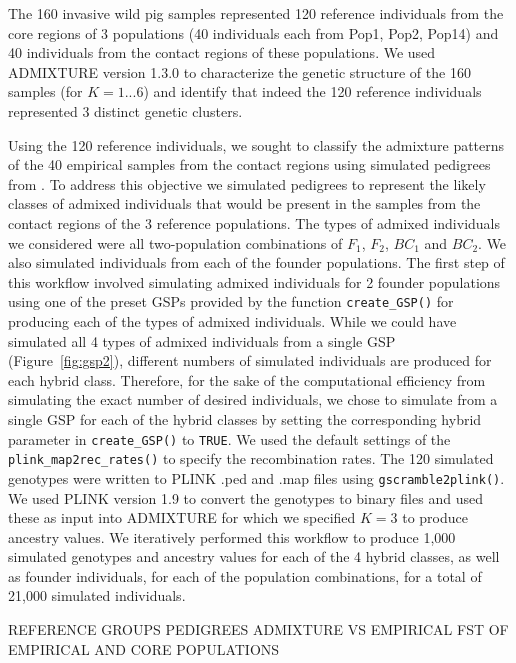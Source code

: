 {The 160 invasive wild pig samples represented 120 reference individuals from the core regions of 
3 populations (40 individuals each from Pop1, Pop2, Pop14) and 40 individuals from the contact regions of these populations. 
We used ADMIXTURE version 1.3.0 \citep{alexander2009fast} to characterize the genetic structure of the 160 samples (for $K = {1...6}$)
and identify that indeed the 120 reference individuals represented 3 distinct genetic clusters.

Using the 120 reference individuals, we sought to classify the admixture patterns of the 40 empirical samples 
from the contact regions using simulated pedigrees from \gscramble{}. To address this objective we simulated 
pedigrees to represent the likely classes of admixed individuals that would be present in the samples 
from the contact regions of the 3 reference populations. The types of admixed individuals we considered were 
all two-population combinations of $F_1$, $F_2$, $BC_1$ and $BC_2$. We also 
simulated individuals from each of the founder populations. The first step of this workflow involved 
simulating admixed individuals for 2 founder populations using one of the preset \gscramble{} 
GSPs provided by the function {\footnotesize\tt create\_GSP()} for producing each of the types of admixed 
individuals. While we could have simulated all 4 types of admixed individuals from a single GSP (Figure~\ref{fig:gsp2}), 
different numbers of simulated individuals are produced for each hybrid class. Therefore, for the sake of the 
computational efficiency from simulating the exact number of desired individuals, we chose to simulate from 
a single GSP for each of the hybrid classes by setting the corresponding hybrid parameter in {\footnotesize\tt create\_GSP()} to {\footnotesize\tt TRUE}. We used the default settings of the {\footnotesize\tt plink\_map2rec\_rates()} to specify the recombination rates. The 120 simulated genotypes were written to PLINK .ped and .map files using {\footnotesize\tt gscramble2plink()}. We used PLINK version 1.9 \citep{purcell2007plink} to convert the genotypes to binary files and used these as input into ADMIXTURE for which we specified $K=3$ to produce ancestry values. We iteratively 
performed this workflow to produce 1,000 simulated genotypes and ancestry values for each of the 
4 hybrid classes, as well as founder individuals, for each of the population combinations, for a total of 
21,000 simulated individuals.


\gscramble{} REFERENCE GROUPS
\gscramble{} PEDIGREES
ADMIXTURE \gscramble{} VS EMPIRICAL
FST OF EMPIRICAL AND \gscramble{} CORE POPULATIONS






}
